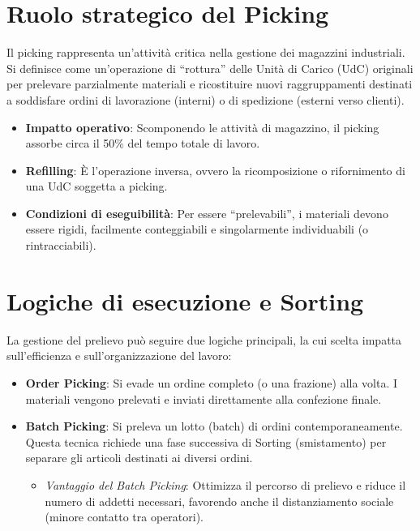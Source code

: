%
%
\section{Ruolo strategico del Picking}
Il picking rappresenta un'attività critica nella gestione dei magazzini industriali. Si definisce come un'operazione di ``rottura'' delle Unità di Carico (UdC) originali per prelevare parzialmente materiali e ricostituire nuovi raggruppamenti destinati a soddisfare ordini di lavorazione (interni) o di spedizione (esterni verso clienti).
\begin{itemize}
    \item \textbf{Impatto operativo}: Scomponendo le attività di magazzino, il picking assorbe circa il 50\% del tempo totale di lavoro.
    \item \textbf{Refilling}: È l'operazione inversa, ovvero la ricomposizione o rifornimento di una UdC soggetta a picking.
    \item \textbf{Condizioni di eseguibilità}: Per essere ``prelevabili'', i materiali devono essere rigidi, facilmente conteggiabili e singolarmente individuabili (o rintracciabili).
\end{itemize}
%
\section{Logiche di esecuzione e Sorting}
La gestione del prelievo può seguire due logiche principali, la cui scelta impatta sull'efficienza e sull'organizzazione del lavoro:
\begin{itemize}
    \item \textbf{Order Picking}: Si evade un ordine completo (o una frazione) alla volta. I materiali vengono prelevati e inviati direttamente alla confezione finale.
    \item \textbf{Batch Picking}: Si preleva un lotto (batch) di ordini contemporaneamente. Questa tecnica richiede una fase successiva di Sorting (smistamento) per separare gli articoli destinati ai diversi ordini.
          \begin{itemize}
              \item \emph{Vantaggio del Batch Picking}: Ottimizza il percorso di prelievo e riduce il numero di addetti necessari, favorendo anche il distanziamento sociale (minore contatto tra operatori).
          \end{itemize}
\end{itemize}

%

